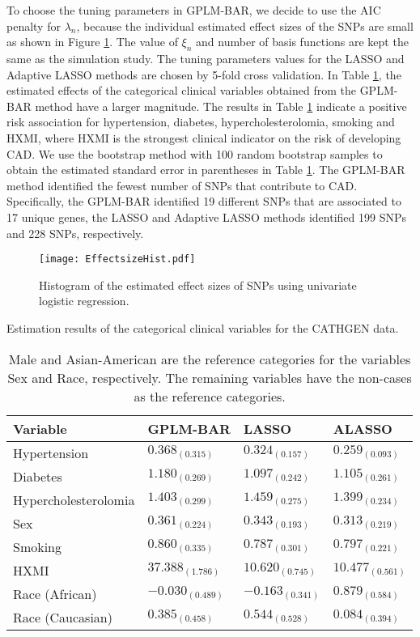 \documentclass[11pt]{article}
\begin{document}
To choose the tuning parameters in GPLM-BAR, we decide to use the AIC penalty for $\lambda_n$, because the individual estimated effect sizes of the SNPs are small as shown in Figure \ref{fig4}. The value of $\xi_n$ and number of basis functions are kept the same as the simulation study. The tuning parameters values for the LASSO and Adaptive LASSO methods are chosen by 5-fold cross validation. In Table \ref{table4}, the estimated effects of the categorical clinical variables obtained from the GPLM-BAR method have a larger magnitude. The results in Table \ref{table4} indicate a positive risk association for hypertension, diabetes, hypercholesterolomia, smoking and HXMI, where HXMI is the strongest clinical indicator on the risk of developing CAD. We use the bootstrap method with 100 random bootstrap samples to obtain the estimated standard error in parentheses in Table \ref{table4}. The GPLM-BAR method identified the fewest number of SNPs that contribute to CAD. Specifically, the GPLM-BAR identified 19 different SNPs that are associated to 17 unique genes, the LASSO and Adaptive LASSO methods identified 199 SNPs and 228 SNPs, respectively. 

\begin{figure}
\centering
\texttt{[image: EffectsizeHist.pdf]}
\caption{Histogram of the estimated effect sizes of SNPs using univariate logistic regression.} \label{fig4}
\end{figure}

\begin{table}
\centering
\caption{Estimation results of the categorical clinical variables for the CATHGEN data.} \label{table4}
\begin{tabular}{l| lll }
\hline
Variable & GPLM-BAR & LASSO & ALASSO \\
\hline
Hypertension & $0.368_{(0.315)}$ & $0.324_{(0.157)}$ & $0.259_{(0.093)}$\\
Diabetes & $1.180_{(0.269)}$ & $1.097_{(0.242)}$ & $1.105_{(0.261)}$\\
Hypercholesterolomia & $1.403_{(0.299)}$ & $1.459_{(0.275)}$ & $1.399_{(0.234)}$ \\
Sex & $0.361_{(0.224)}$ & $0.343_{(0.193)}$ & $0.313_{(0.219)}$\\
Smoking & $0.860_{(0.335)}$ & $0.787_{(0.301)}$ & $0.797_{(0.221)}$ \\
HXMI & $37.388_{(1.786)}$ & $10.620_{(0.745)}$ & $10.477_{(0.561)}$ \\
Race (African) & $-0.030_{(0.489)}$ & $-0.163_{(0.341)}$ & $0.879_{(0.584)}$\\
Race (Caucasian) & $0.385_{(0.458)}$ & $0.544_{(0.528)}$ & $0.084_{(0.394)}$\\
\hline 
\end{tabular}
\caption*{Male and Asian-American are the reference categories for the variables Sex and Race, respectively. The remaining variables have the non-cases as the reference categories.}
\end{table}
\end{document}
